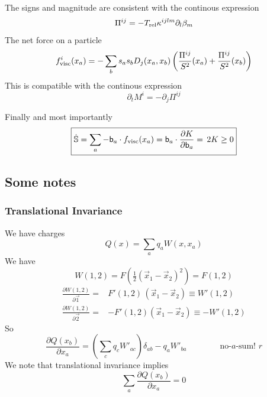 \documentclass[12pt,aps,preprint,nofootinbib,noshowkeys,noshowpacs,longbibliography,superscriptaddress,tightenlines]{revtex4-2}
\def\Sbb{{\mathbb S}}
\def\bbeta{{\sf b}}
\def\st{\begin{equation}}
\def\stp{\end{equation}}
\def\E{{\mathcal E}}
\begin{document}
The signs and magnitude are consistent with the  continous expression 
\st
\Pi^{ij} = - T_{\rm rel} \kappa^{ijlm} \partial_l \beta_m
\stp
The net force on a particle  
\st
f^i_{\rm visc}(x_a) = - \sum_b s_a s_b  D_j (x_a ,x_b) \left(\frac{\Pi^{ij}}{S^2} (x_a)  + \frac{\Pi^{ij}}{S^2} (x_b) \right)   
\stp
This 
is compatible with the continous expression 
\st
  \partial_t M^i = - \partial_j \Pi^{ij}
\stp

Finally and most importantly
\st
\boxed{
\dot \Sbb =  \sum_{a} -\bbeta_a \cdot f_{\rm  visc}(x_a) =   \bbeta_a \cdot  \frac{\partial K }{\partial \bbeta_{a} } =\,  2  K \geq 0
}
\stp





\subsection{Some notes} 

\subsubsection{Translational Invariance}
We have charges
\st
Q(x) = \sum_a q_a W(x, x_a)
\stp
We have 
\st
W(1, 2) = F(\tfrac{1}{2} (\vec{x}_1 -\vec{x}_2)^2 ) = F(1, 2)
\stp
\begin{align}
    \frac{\partial W(1,2)}{\partial \vec{1}}   =& F'(1, 2) \, (\vec{x}_1 - \vec{x}_2) \equiv W'(1,2 ) \\
    \frac{\partial W(1, 2)}{\partial \vec{2}} =&  -F'(1, 2) (\vec{x}_1 - \vec{x}_2) \equiv  - W'(1,2 )
\end{align}
So
\st
\frac{\partial Q(x_b) }{\partial x_a}  = \left(\sum_{c} q_c W'_{ac}\right)\delta_{ab} - q_a W'_{ba}  \qquad \qquad \mbox{no-$a$-sum! } 
r 
\stp
We note that  translational invariance implies
\st
 \sum_a  \frac{\partial Q(x_b) }{\partial x_a} = 0 
\stp
\end{document}
